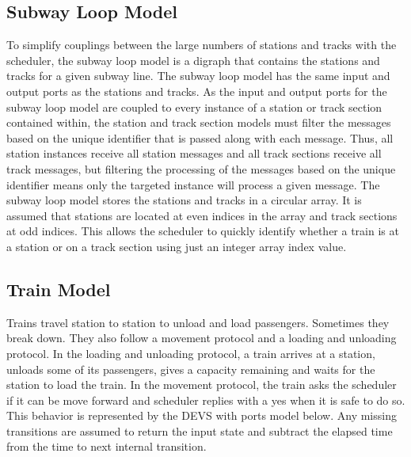 \subsection{Subway Loop Model}

To simplify couplings between the large numbers of stations and tracks with the scheduler, the subway loop model is a digraph that contains the stations and tracks for a given subway line.  The subway loop model has the same input and output ports as the stations and tracks.  As the input and output ports for the subway loop model are coupled to every instance of a station or track section contained within, the station and track section models must filter the messages based on the unique identifier that is passed along with each message. Thus, all station instances receive all station messages and all track sections receive all track messages, but filtering the processing of the messages based on the unique identifier means only the targeted instance will process a given message. The subway loop model stores the stations and tracks in a circular array.  It is assumed that stations are located at even indices in the array and track sections at odd indices. This allows the scheduler to quickly identify whether a train is at a station or on a track section using just an integer array index value.

\subsection{Train Model}

Trains travel station to station to unload and load passengers. Sometimes they
break down. They also follow a movement protocol and a loading and unloading
protocol. In the loading and unloading protocol, a train arrives at a station,
unloads some of its passengers, gives a capacity remaining and waits for the 
station to load the train. In the movement
protocol, the train asks the scheduler if it can be move forward and scheduler
replies with a yes when it is safe to do so. This behavior is represented by 
the DEVS with ports model below. Any missing transitions are assumed to return
the input state and subtract the elapsed time from the time to next internal
transition. 

\newcommand{\InBreakDown}[1]{(\text{``Breakdown''}, #1)}
\newcommand{\InMoveStationRes}[1]{(\text{``Move Station Res''}, #1)}
\newcommand{\InMoveSectionRes}[1]{(\text{``Move Section Res''}, #1)}
\newcommand{\InLoadPassengers}[1]{(\text{``Load Passengers''}, #1)}


